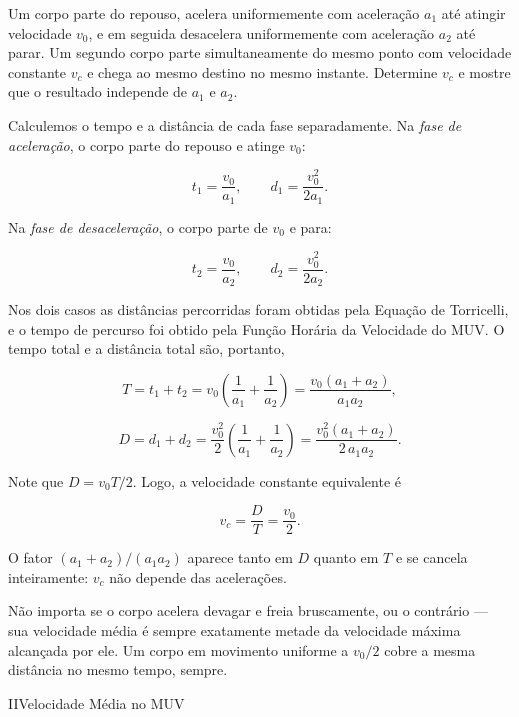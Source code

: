 \begin{exemplo}\label{exemplo_cinematicaescalar_torricelliex03}

Um corpo parte do repouso, acelera uniformemente com aceleração $a_1$ até atingir
velocidade $v_0$, e em seguida desacelera uniformemente com aceleração $a_2$ até
parar. Um segundo corpo parte simultaneamente do mesmo ponto com velocidade
constante $v_c$ e chega ao mesmo destino no mesmo instante. Determine $v_c$ e mostre
que o resultado independe de $a_1$ e $a_2$.

\resolucao

Calculemos o tempo e a distância de cada fase separadamente. Na \textit{fase de
aceleração}, o corpo parte do repouso e atinge $v_0$:

$$ t_1 = \frac{v_0}{a_1}, \qquad d_1 = \frac{v_0^2}{2a_1}. $$

Na \textit{fase de desaceleração}, o corpo parte de $v_0$ e para:

$$ t_2 = \frac{v_0}{a_2}, \qquad d_2 = \frac{v_0^2}{2a_2}. $$

Nos dois casos as distâncias percorridas foram obtidas pela Equação de Torricelli, e o tempo de percurso foi obtido pela Função Horária da Velocidade do MUV. O tempo total e a distância total são, portanto,

$$ T = t_1 + t_2 = v_0\!\left(\frac{1}{a_1}+\frac{1}{a_2}\right)
     = \frac{v_0(a_1+a_2)}{a_1 a_2}, $$

$$ D = d_1 + d_2 = \frac{v_0^2}{2}\!\left(\frac{1}{a_1}+\frac{1}{a_2}\right)
     = \frac{v_0^2(a_1+a_2)}{2\,a_1 a_2}. $$

Note que $D = v_0 T/2$. Logo, a velocidade constante equivalente é

$$ \boxed{v_c = \frac{D}{T} = \frac{v_0}{2}.} $$

O fator $(a_1+a_2)/(a_1 a_2)$ aparece tanto em $D$ quanto em $T$ e se cancela
inteiramente: $v_c$ não depende das acelerações.

Não importa se o corpo acelera devagar e freia bruscamente, ou o contrário --- sua
velocidade média é sempre exatamente metade da velocidade máxima alcançada por ele. Um corpo em movimento
uniforme a $v_0/2$ cobre a mesma distância no mesmo tempo, sempre.

\end{exemplo}
\vspace{0.3cm}




\begin{secnivel}{II}{Velocidade Média no MUV}
 

  
\end{secnivel}








